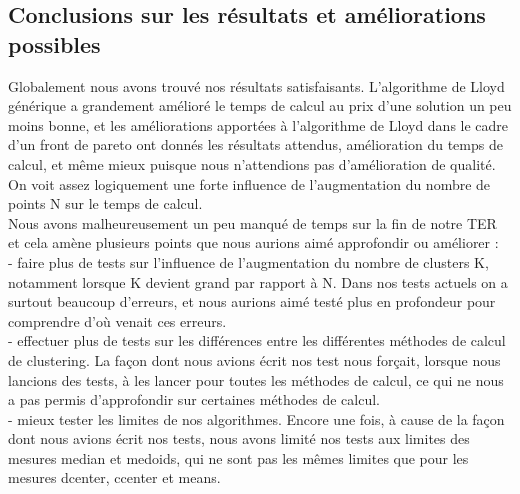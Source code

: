 ﻿\documentclass{meta}
\begin{document}
{\subsection{Conclusions sur les résultats et améliorations possibles}
Globalement nous avons trouvé nos résultats satisfaisants. L'algorithme de Lloyd générique a grandement amélioré le temps de calcul au prix d'une solution un peu moins bonne, et les améliorations apportées à l'algorithme de Lloyd dans le cadre d'un front de pareto ont donnés les résultats attendus, amélioration du temps de calcul, et même mieux puisque nous n'attendions pas d'amélioration de qualité. On voit assez logiquement une forte influence de l'augmentation du nombre de points N sur le temps de calcul.\\
Nous avons malheureusement un peu manqué de temps sur la fin de notre TER et cela amène plusieurs points que nous aurions aimé approfondir ou améliorer :\\
- faire plus de tests sur l'influence de l'augmentation du nombre de clusters K, notamment lorsque K devient grand par rapport à N. Dans nos tests actuels on a surtout beaucoup d'erreurs, et nous aurions aimé testé plus en profondeur pour comprendre d'où venait ces erreurs.\\
- effectuer plus de tests sur les différences entre les différentes méthodes de calcul de clustering. La façon dont nous avions écrit nos test nous forçait, lorsque nous lancions des tests, à les lancer pour toutes les méthodes de calcul, ce qui ne nous a pas permis d'approfondir sur certaines méthodes de calcul.\\
- mieux tester les limites de nos algorithmes. Encore une fois, à cause de la façon dont nous avions écrit nos tests, nous avons limité nos tests aux limites des mesures median et medoids, qui ne sont pas les mêmes limites que pour les mesures dcenter, ccenter et means.

}
\end{document}
